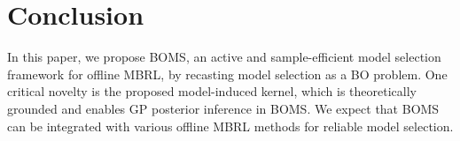 \vspace{-1mm}
\section{Conclusion}
\vspace{-1mm}
In this paper, we propose BOMS, an active and sample-efficient model selection framework for offline MBRL, by recasting model selection as a BO problem. One critical novelty is the proposed model-induced kernel, which is theoretically grounded and enables GP posterior inference in BOMS.
We expect that BOMS can be integrated with various offline MBRL methods for reliable model selection.
